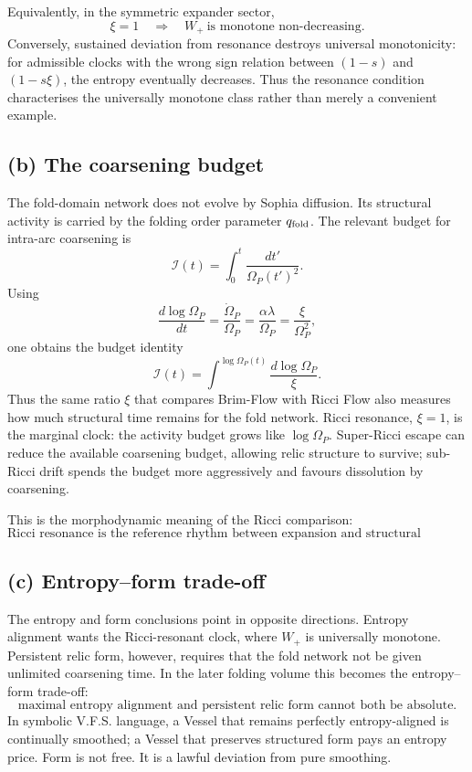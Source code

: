 \documentclass[11pt]{article}
\begin{document}
Equivalently, in the symmetric expander sector,
\[
 \boxed{\xi=1\quad\Longrightarrow\quad W_+\ \text{is monotone non-decreasing}.}
\]
Conversely, sustained deviation from resonance destroys universal monotonicity: for admissible clocks with the wrong sign relation between \((1-s)\) and \((1-s\xi)\), the entropy eventually decreases. Thus the resonance condition characterises the universally monotone class rather than merely a convenient example.

\subsection*{(b) The coarsening budget}

The fold-domain network does not evolve by Sophia diffusion. Its structural activity is carried by the folding order parameter \(q_{\rm fold}\). The relevant budget for intra-arc coarsening is
\[
 \mathcal I(t)=\int_0^t \frac{dt'}{\Omega_P(t')^2}.
\]
Using
\[
 \frac{d\log\Omega_P}{dt}
 =
 \frac{\dot\Omega_P}{\Omega_P}
 =
 \frac{\alpha\lambda}{\Omega_P}
 =
 \frac{\xi}{\Omega_P^2},
\]
one obtains the budget identity
\[
 \boxed{\mathcal I(t)=\int^{\log\Omega_P(t)}\frac{d\log\Omega_P}{\xi}.}
\]
Thus the same ratio \(\xi\) that compares Brim-Flow with Ricci Flow also measures how much structural time remains for the fold network. Ricci resonance, \(\xi=1\), is the marginal clock: the activity budget grows like \(\log\Omega_P\). Super-Ricci escape can reduce the available coarsening budget, allowing relic structure to survive; sub-Ricci drift spends the budget more aggressively and favours dissolution by coarsening.

This is the morphodynamic meaning of the Ricci comparison:
\[
 \text{Ricci resonance is the reference rhythm between expansion and structural relaxation.}
\]

\subsection*{(c) Entropy--form trade-off}

The entropy and form conclusions point in opposite directions. Entropy alignment wants the Ricci-resonant clock, where \(W_+\) is universally monotone. Persistent relic form, however, requires that the fold network not be given unlimited coarsening time. In the later folding volume this becomes the entropy--form trade-off:
\[
 \boxed{\text{maximal entropy alignment and persistent relic form cannot both be absolute.}}
\]
In symbolic V.F.S. language, a Vessel that remains perfectly entropy-aligned is continually smoothed; a Vessel that preserves structured form pays an entropy price. Form is not free. It is a lawful deviation from pure smoothing.
\end{document}
